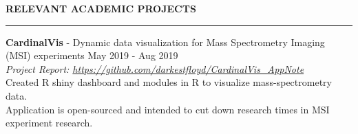 \documentclass[a4paper]{article}
\newcommand{\myline}{\par
  \kern2pt %
  \hrule height 0.5pt
  \kern2pt %
}
\newcommand{\mybullet}{
	\indent 
  \textbullet \hspace*{2mm}
}
\begin{document}
\noindent
{\large \textbf{RELEVANT ACADEMIC PROJECTS}}
\myline 
\smallskip

      \noindent
      \textbf{CardinalVis} - 
      Dynamic data visualization for Mass Spectrometry Imaging (MSI) experiments 
      \hfill May 2019 - Aug 2019 \\
      \hfill \textit{Project Report: \href{https://github.com/darkestfloyd/CardinalVis\_AppNote/blob/master/Summer\%20Full\%20Project\%20Final\%20Report.pdf}{https://github.com/darkestfloyd/CardinalVis\_AppNote}}\\
      \mybullet Created R shiny dashboard and modules in R to visualize mass-spectrometry data. \\
      \mybullet Application is open-sourced and intended to cut down research times in MSI experiment research. \\
\end{document}
